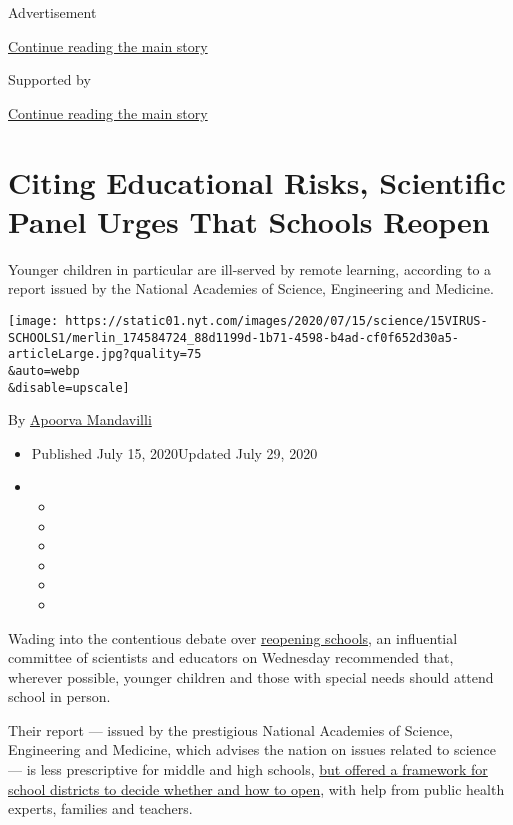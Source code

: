 Advertisement

\protect\hyperlink{after-top}{Continue reading the main story}

Supported by

\protect\hyperlink{after-sponsor}{Continue reading the main story}

\hypertarget{citing-educational-risks-scientific-panel-urges-that-schools-reopen}{%
\section{Citing Educational Risks, Scientific Panel Urges That Schools
Reopen}\label{citing-educational-risks-scientific-panel-urges-that-schools-reopen}}

Younger children in particular are ill-served by remote learning,
according to a report issued by the National Academies of Science,
Engineering and Medicine.

\texttt{[image: https://static01.nyt.com/images/2020/07/15/science/15VIRUS-SCHOOLS1/merlin\_174584724\_88d1199d-1b71-4598-b4ad-cf0f652d30a5-articleLarge.jpg?quality=75\\\&auto=webp\\\&disable=upscale]}

By \href{https://www.nytimes.com/by/apoorva-mandavilli}{Apoorva
Mandavilli}

\begin{itemize}
\item
  Published July 15, 2020Updated July 29, 2020
\item
  \begin{itemize}
  \item
  \item
  \item
  \item
  \item
  \item
  \end{itemize}
\end{itemize}

Wading into the contentious debate over
\href{https://www.nytimes.com/2020/07/29/magazine/schools-reopening-covid.html}{reopening
schools}, an influential committee of scientists and educators on
Wednesday recommended that, wherever possible, younger children and
those with special needs should attend school in person.

Their report --- issued by the prestigious National Academies of
Science, Engineering and Medicine, which advises the nation on issues
related to science --- is less prescriptive for middle and high schools,
\href{https://www.nationalacademies.org/news/2020/07/schools-should-prioritize-reopening-in-fall-2020-especially-for-grades-k-5-while-weighing-risks-and-benefits}{but
offered a framework for school districts to decide whether and how to
open}, with help from public health experts, families and teachers.

